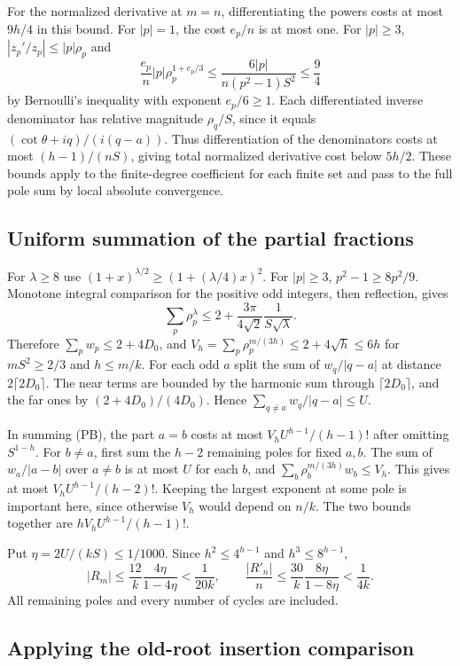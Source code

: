 For the normalized derivative at $m=n$, differentiating the powers costs at most $9h/4$ in this bound. For $|p|=1$, the cost $e_p/n$ is at most one. For $|p|\ge3$, $|z_p'/z_p|\le|p|\rho_p$ and
\[
\frac{e_p}{n}|p|\rho_p^{1+e_p/3}
\le \frac{6|p|}{n(p^2-1)S^2}\le\frac94
\]
by Bernoulli's inequality with exponent $e_p/6\ge1$. Each differentiated inverse denominator has relative magnitude $\rho_q/S$, since it equals $(\cot\theta+iq)/(i(q-a))$. Thus differentiation of the denominators costs at most $(h-1)/(nS)$, giving total normalized derivative cost below $5h/2$. These bounds apply to the finite-degree coefficient for each finite set and pass to the full pole sum by local absolute convergence.

\subsection{Uniform summation of the partial fractions}

For $\lambda\ge 8$ use $(1+x)^{\lambda/2}\ge(1+(\lambda/4)x)^2$. For $|p|\ge3$, $p^2-1\ge8p^2/9$. Monotone integral comparison for the positive odd integers, then reflection, gives
\[
\sum_p\rho_p^\lambda\le2+\frac{3\pi}{4\sqrt2}\frac1{S\sqrt\lambda}.
\]
Therefore $\sum_p w_p\le2+4D_0$, and $V_h=\sum_p\rho_p^{m/(3h)}\le 2+4\sqrt h\le6h$ for $mS^2\ge2/3$ and $h\le m/k$. For each odd $a$ split the sum of $w_q/|q-a|$ at distance $2\lceil2D_0\rceil$. The near terms are bounded by the harmonic sum through $\lceil2D_0\rceil$, and the far ones by $(2+4D_0)/(4D_0)$. Hence $\sum_{q\ne a}w_q/|q-a|\le U$.

In summing (PB), the part $a=b$ costs at most $V_h U^{h-1}/(h-1)!$ after omitting $S^{1-h}$. For $b\ne a$, first sum the $h-2$ remaining poles for fixed $a,b$. The sum of $w_a/|a-b|$ over $a\ne b$ is at most $U$ for each $b$, and $\sum_b\rho_b^{m/(3h)}w_b\le V_h$. This gives at most $V_h U^{h-1}/(h-2)!$. Keeping the largest exponent at some pole is important here, since otherwise $V_h$ would depend on $n/k$. The two bounds together are $h V_h U^{h-1}/(h-1)!$.

Put $\eta=2U/(kS)\le1/1000$. Since $h^2\le 4^{h-1}$ and $h^3\le8^{h-1}$,
\[
|R_m|\le \frac{12}{k}\frac{4\eta}{1-4\eta}<\frac1{20k},\qquad
\frac{|R'_n|}{n}\le \frac{30}{k}\frac{8\eta}{1-8\eta}<\frac1{4k}. \tag{PC}
\]
All remaining poles and every number of cycles are included.

\subsection{Applying the old-root insertion comparison}

